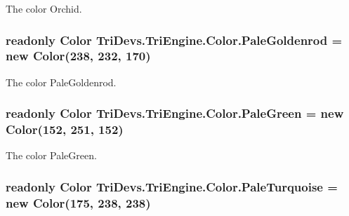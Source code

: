 The color Orchid. 

\hypertarget{struct_tri_devs_1_1_tri_engine_1_1_color_a089605daa4994fb559e680263c562555}{
\subsubsection[{Pale\-Goldenrod}]{\setlength{\rightskip}{0pt plus 5cm}readonly {\bf Color} Tri\-Devs.\-Tri\-Engine.\-Color.\-Pale\-Goldenrod = new {\bf Color}(238, 232, 170)\hspace{0.3cm}{\ttfamily [static]}}}\label{struct_tri_devs_1_1_tri_engine_1_1_color_a089605daa4994fb559e680263c562555}


The color Pale\-Goldenrod. 

\hypertarget{struct_tri_devs_1_1_tri_engine_1_1_color_ad1715eb16c71e0eda750768b81989ffa}{
\subsubsection[{Pale\-Green}]{\setlength{\rightskip}{0pt plus 5cm}readonly {\bf Color} Tri\-Devs.\-Tri\-Engine.\-Color.\-Pale\-Green = new {\bf Color}(152, 251, 152)\hspace{0.3cm}{\ttfamily [static]}}}\label{struct_tri_devs_1_1_tri_engine_1_1_color_ad1715eb16c71e0eda750768b81989ffa}


The color Pale\-Green. 

\hypertarget{struct_tri_devs_1_1_tri_engine_1_1_color_a4f3ac681fa604a37a8dc798e42a2f471}{
\subsubsection[{Pale\-Turquoise}]{\setlength{\rightskip}{0pt plus 5cm}readonly {\bf Color} Tri\-Devs.\-Tri\-Engine.\-Color.\-Pale\-Turquoise = new {\bf Color}(175, 238, 238)\hspace{0.3cm}{\ttfamily [static]}}}\label{struct_tri_devs_1_1_tri_engine_1_1_color_a4f3ac681fa604a37a8dc798e42a2f471}


